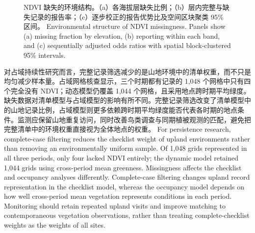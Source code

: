 \fi
\begin{figure}[htbp]\centering
{}
\caption{\ifzh
NDVI 缺失的环境结构。（a）各海拔层缺失比例；（b）层内完整与缺失记录的报告率；（c）逐步校正的报告优势比及空间区块聚类 95\% 区间。
\else
Environmental structure of NDVI missingness. Panels show (a) missing fraction by elevation, (b) reporting within each band, and (c) sequentially adjusted odds ratios with spatial block-clustered 95\% intervals.
\fi}\label{fig:envmissing}
\end{figure}
\ifzh
对占域持续性研究而言，完整记录筛选减少的是山地环境中的清单权重，而不只是均匀减少样本量。占域网格核查显示，三个时期都有记录的 1,048 个网格中只有四个完全没有 NDVI；动态模型仍覆盖 1,044 个网格，且采用地点跨时期平均绿度。缺失数据对清单模型与占域模型的影响有所不同。完整记录筛选改变了清单模型中的山地记录比例，占域模型则更多依赖跨时期平均绿度能否代表各时期的地点条件。监测应保留山地重复访问，同时改善鸟类调查与同期植被观测的匹配，避免把完整清单中的环境权重直接视为全体地点的权重。
\else
For persistence research, complete-case filtering reduces the checklist weight of upland environments rather than removing an environmentally uniform sample. Of 1,048 grids represented in all three periods, only four lacked NDVI entirely; the dynamic model retained 1,044 grids using cross-period mean greenness. Missingness affects the checklist and occupancy analyses differently. Complete-case filtering changes upland record representation in the checklist model, whereas the occupancy model depends on how well cross-period mean vegetation represents conditions in each period. Monitoring should retain repeated upland visits and improve matching to contemporaneous vegetation observations, rather than treating complete-checklist weights as the weights of all sites.
\fi
\FloatBarrier
